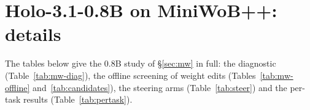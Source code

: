 \section{Holo-3.1-0.8B on MiniWoB++: details}
\label{app:mw}
The tables below give the 0.8B study of \S\ref{sec:mw} in full: the diagnostic (Table~\ref{tab:mw-diag}), the offline screening of weight edits (Tables~\ref{tab:mw-offline} and~\ref{tab:candidates}), the steering arms (Table~\ref{tab:steer}) and the per-task results (Table~\ref{tab:pertask}).




\FloatBarrier
